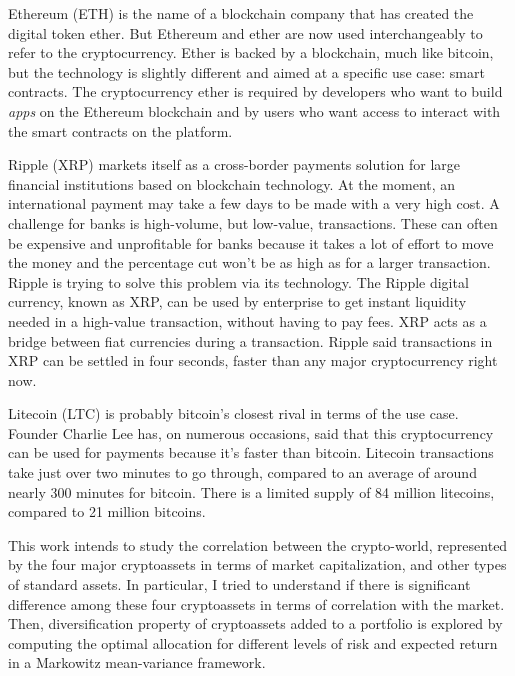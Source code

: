 \bigskip
Ethereum (ETH) is the name of a blockchain company that has created the digital token ether. But Ethereum and ether are now used interchangeably to refer to the cryptocurrency.
Ether is backed by a blockchain, much like bitcoin, but the technology is slightly different and aimed at a specific use case: smart contracts.
The cryptocurrency ether is required by developers who want to build \textit{apps} on the Ethereum blockchain and by users who want access to interact with the smart contracts on the platform.

\bigskip
Ripple (XRP) markets itself as a cross-border payments solution for large financial institutions based on blockchain technology.
At the moment, an international payment may take a few days to be made with a very high cost. A challenge for banks is high-volume, but low-value, transactions.
These can often be expensive and unprofitable for banks because it takes a lot of effort to move the money and the percentage cut won’t be as high as for a larger transaction.
Ripple is trying to solve this problem via its technology.
The Ripple digital currency, known as XRP, can be used by enterprise to get instant liquidity needed in a high-value transaction, without having to pay fees.
XRP acts as a bridge between fiat currencies during a transaction. Ripple said transactions in XRP can be settled in four seconds, faster than any major cryptocurrency right now.

\bigskip
Litecoin (LTC) is probably bitcoin’s closest rival in terms of the use case. Founder Charlie Lee has, on numerous occasions, said that this cryptocurrency can be used for payments because it’s faster than bitcoin.
Litecoin transactions take just over two minutes to go through, compared to an average of around nearly 300 minutes for bitcoin.
There is a limited supply of 84 million litecoins, compared to 21 million bitcoins.

\bigskip
This work intends to study the correlation between the crypto-world, represented by the four major cryptoassets in terms of market capitalization, and other types of standard assets. In particular, I tried to understand if there is significant difference among these four cryptoassets in terms of correlation with the market.
Then, diversification property of cryptoassets added to a portfolio is explored by computing the optimal allocation for different levels of risk and expected return in a Markowitz mean-variance framework.

